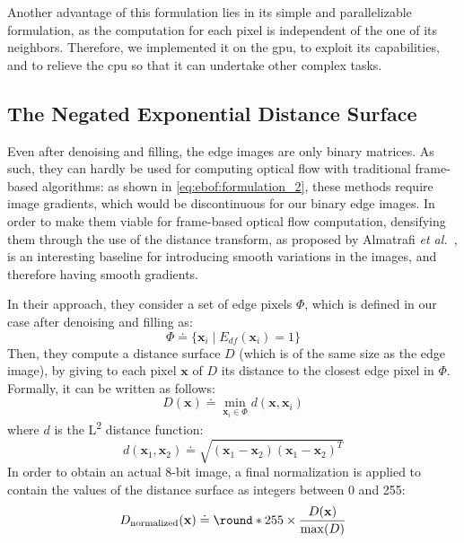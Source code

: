 Another advantage of this formulation lies in its simple and parallelizable formulation, as the computation for each pixel is independent of the one of its neighbors. Therefore, we implemented it on the \acrshort{gpu}, to exploit its capabilities, and to relieve the \acrshort{cpu} so that it can undertake other complex tasks.

\subsection{The Negated Exponential Distance Surface}\label{sec:ebof:inv_exp_dist_surf}
Even after denoising and filling, the edge images are only binary matrices. As such, they can hardly be used for computing optical flow with traditional frame-based algorithms: as shown in \cref{eq:ebof:formulation_2}, these methods require image gradients, which would be discontinuous for our binary edge images. In order to make them viable for frame-based optical flow computation, densifying them through the use of the distance transform, as proposed by Almatrafi \textit{et al.}~\cite{Almatrafi2020DistanceSF}, is an interesting baseline for introducing smooth variations in the images, and therefore having smooth gradients.

In their approach, they consider a set of edge pixels \(\Phi\), which is defined in our case after denoising and filling as:
\begin{equation}
  \Phi \doteq \{\mathbf{x}_i \mid E_{df}(\mathbf{x}_i) = 1\}
\end{equation}
Then, they compute a distance surface \(D\) (which is of the same size as the edge image), by giving to each pixel \(\mathbf{x}\) of \(D\) its distance to the closest edge pixel in \(\Phi\). Formally, it can be written as follows:
\begin{equation}
  D(\mathbf{x}) \doteq \min_{\mathbf{x}_i \in \Phi} d(\mathbf{x}, \mathbf{x}_i)
\end{equation}
where \(d\) is the L\textsuperscript{2} distance function:
\begin{equation}
  d(\mathbf{x}_1, \mathbf{x}_2) \doteq \sqrt{(\mathbf{x}_1 - \mathbf{x}_2)(\mathbf{x}_1 - \mathbf{x}_2)^T}
\end{equation}
In order to obtain an actual 8-bit image, a final normalization is applied to contain the values of the distance surface as integers between 0 and 255:
\begin{equation}\label{eq:ebof:dist_surf_norm}
  D_\text{normalized}(\mathbf{x}) \doteq \round*{255 \times \frac{D(\mathbf{x})}{\max(D)}}
\end{equation}

